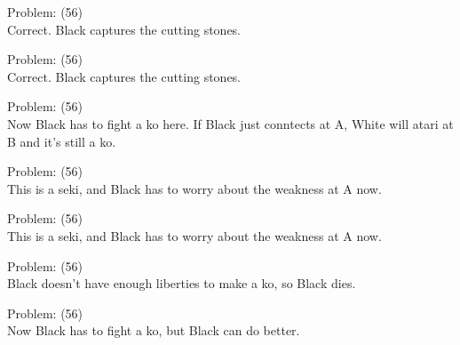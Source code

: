 \documentclass[11pt]{article}
\begin{document}
\begin{minipage}[t]{0.5\textwidth}
  {\centering
  
  Problem: (56)\\
  Correct. Black captures the cutting stones.\\
  }
\end{minipage}
\begin{minipage}[t]{0.5\textwidth}
  {\centering
  
  Problem: (56)\\
  Correct. Black captures the cutting stones.\\
  }
\end{minipage}
\begin{minipage}[t]{0.5\textwidth}
  {\centering
  
  Problem: (56)\\
  Now Black has to fight a ko here. If Black just conntects at A, White will atari at B and it's still a ko.\\
  }
\end{minipage}
\begin{minipage}[t]{0.5\textwidth}
  {\centering
  
  Problem: (56)\\
  This is a seki, and Black has to worry about the weakness at A now.\\
  }
\end{minipage}
\begin{minipage}[t]{0.5\textwidth}
  {\centering
  
  Problem: (56)\\
  This is a seki, and Black has to worry about the weakness at A now.\\
  }
\end{minipage}
\begin{minipage}[t]{0.5\textwidth}
  {\centering
  
  Problem: (56)\\
  Black doesn't have enough liberties to make a ko, so Black dies.\\
  }
\end{minipage}
\begin{minipage}[t]{0.5\textwidth}
  {\centering
  
  Problem: (56)\\
  Now Black has to fight a ko, but Black can do better.\\
  }
\end{minipage}
\end{document}
